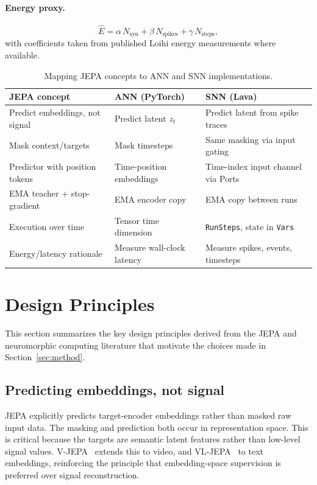 \documentclass[11pt,a4paper]{article}
\begin{document}
\paragraph{Energy proxy.}
\begin{equation}\label{eq:energy}
\hat{E} =
  \alpha\, N_{\text{syn}}
  + \beta\, N_{\text{spikes}}
  + \gamma\, N_{\text{steps}},
\end{equation}
with coefficients taken from published Loihi energy measurements where
available.

\begin{table}[htbp]
\centering
\caption{Mapping JEPA concepts to ANN and SNN implementations.}
\label{tab:mapping}
\smallskip
\begin{tabular}{@{}lll@{}}
\toprule
\textbf{JEPA concept} & \textbf{ANN (PyTorch)} & \textbf{SNN (Lava)} \\
\midrule
Predict embeddings, not signal
  & Predict latent $z_t$
  & Predict latent from spike traces \\
Mask context/targets
  & Mask timesteps
  & Same masking via input gating \\
Predictor with position tokens
  & Time-position embeddings
  & Time-index input channel via Ports \\
EMA teacher + stop-gradient
  & EMA encoder copy
  & EMA copy between runs \\
Execution over time
  & Tensor time dimension
  & \texttt{RunSteps}, state in \texttt{Vars} \\
Energy/latency rationale
  & Measure wall-clock latency
  & Measure spikes, events, timesteps \\
\bottomrule
\end{tabular}
\end{table}

\section{Design Principles}

This section summarizes the key design principles derived from the JEPA
and neuromorphic computing literature that motivate the choices made in
Section~\ref{sec:method}.

\subsection{Predicting embeddings, not signal}

JEPA explicitly predicts target-encoder embeddings rather than masked raw
input data.  The masking and prediction both occur in representation space.
This is critical because the targets are semantic latent features rather
than low-level signal values.  V-JEPA~\cite{bardes2024vjepa} extends this
to video, and VL-JEPA~\cite{zhai2025vljepa}
to text embeddings, reinforcing the principle that embedding-space
supervision is preferred over signal reconstruction.
\end{document}
